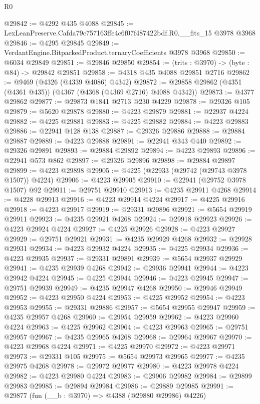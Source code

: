 \begin{lexlean}{R0}
\begin{coremodule}
@29842 := @4292 @435 @4088
@29845 := LexLeanPreserve.Cafda79c757163ffe4c6f07f487422bdf.R0.__fits_15 @3978 @3968
@29846 := @4295 @29845
@29849 := VerdantEngine.BitpackedProduct.ternaryCoefficients @3978 @3968
@29850 := @6034 @29849
@29851 := @29846 @29850
@29854 := (trits : @3970) -> (byte : @84) -> @29842 @29851
@29858 := @4318 @435 @4088 @29851 @2716
@29862 := @9469 (@4326 (@4339 @4086) @4342)
@29872 := @29858 @29862 (@4351 (@4361 @435)) (@4367 (@4368 (@4369 @2716) @4088 @4342))
@29873 := @4377 @29862
@29877 := @29873 @1841 @2713 @230 @4229
@29878 := @29326 @105
@29879 := @5620 @29878
@29880 := @4223 @29879
@29881 := @22937 @4224
@29882 := @4225 @29881
@29883 := @4225 @29882
@29884 := @4223 @29883
@29886 := @22941 @128 @138
@29887 := @29326 @29886
@29888 := @29884 @29887
@29889 := @4223 @29888
@29891 := @22941 @343 @440
@29892 := @29326 @29891
@29893 := @29884 @29892
@29894 := @4223 @29893
@29896 := @22941 @573 @862
@29897 := @29326 @29896
@29898 := @29884 @29897
@29899 := @4223 @29898
@29905 := @4225 (@22933 (@29742 (@29743 @3978 @1507)) @4224)
@29906 := @4223 @29905
@29910 := @22941 (@29752 @3978 @1507) @92
@29911 := @29751 @29910
@29913 := @4235 @29911 @4268
@29914 := @4228 @29913
@29916 := @4223 @29914 @4224
@29917 := @4225 @29916
@29918 := @4223 @29917
@29919 := @29331 @29896
@29921 := @5654 @29919 @29911
@29923 := @4235 @29921 @4268
@29924 := @29918 @29923
@29926 := @4223 @29924 @4224
@29927 := @4225 @29926
@29928 := @4223 @29927
@29929 := @29751 @29921
@29931 := @4235 @29929 @4268
@29932 := @29928 @29931
@29934 := @4223 @29932 @4224
@29935 := @4225 @29934
@29936 := @4223 @29935
@29937 := @29331 @29891
@29939 := @5654 @29937 @29929
@29941 := @4235 @29939 @4268
@29942 := @29936 @29941
@29944 := @4223 @29942 @4224
@29945 := @4225 @29944
@29946 := @4223 @29945
@29947 := @29751 @29939
@29949 := @4235 @29947 @4268
@29950 := @29946 @29949
@29952 := @4223 @29950 @4224
@29953 := @4225 @29952
@29954 := @4223 @29953
@29955 := @29331 @29886
@29957 := @5654 @29955 @29947
@29959 := @4235 @29957 @4268
@29960 := @29954 @29959
@29962 := @4223 @29960 @4224
@29963 := @4225 @29962
@29964 := @4223 @29963
@29965 := @29751 @29957
@29967 := @4235 @29965 @4268
@29968 := @29964 @29967
@29970 := @4223 @29968 @4224
@29971 := @4225 @29970
@29972 := @4223 @29971
@29973 := @29331 @105
@29975 := @5654 @29973 @29965
@29977 := @4235 @29975 @4268
@29978 := @29972 @29977
@29980 := @4223 @29978 @4224
@29982 := @4223 @29980 @4224
@29983 := @29906 @29982
@29984 := @29899 @29983
@29985 := @29894 @29984
@29986 := @29889 @29985
@29991 := @29877 (fun (__b : @3970) => @4388 (@29880 @29986) @4226)

\end{coremodule}
\end{lexlean}
